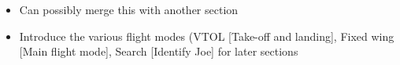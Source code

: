 \color{red}
\begin{itemize}
	\item Can possibly merge this with another section
	\item Introduce the various flight modes (VTOL [Take-off and landing], Fixed wing [Main flight mode], Search [Identify Joe] for later sections
\end{itemize}
\color{black}